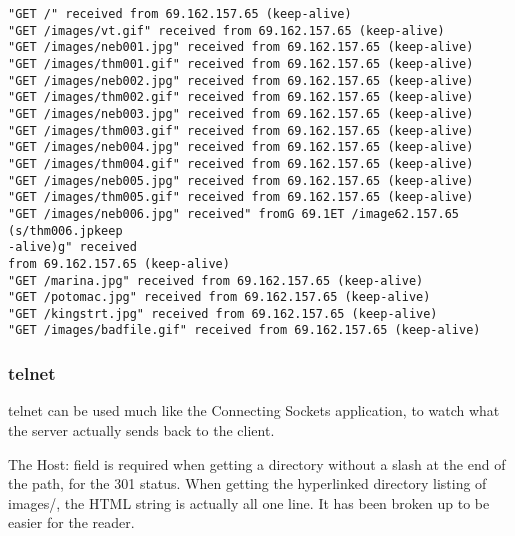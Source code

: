\documentclass[11pt]{report}
\begin{document}
\begin{verbatim}
"GET /" received from 69.162.157.65 (keep-alive)
"GET /images/vt.gif" received from 69.162.157.65 (keep-alive)
"GET /images/neb001.jpg" received from 69.162.157.65 (keep-alive)
"GET /images/thm001.gif" received from 69.162.157.65 (keep-alive)
"GET /images/neb002.jpg" received from 69.162.157.65 (keep-alive)
"GET /images/thm002.gif" received from 69.162.157.65 (keep-alive)
"GET /images/neb003.jpg" received from 69.162.157.65 (keep-alive)
"GET /images/thm003.gif" received from 69.162.157.65 (keep-alive)
"GET /images/neb004.jpg" received from 69.162.157.65 (keep-alive)
"GET /images/thm004.gif" received from 69.162.157.65 (keep-alive)
"GET /images/neb005.jpg" received from 69.162.157.65 (keep-alive)
"GET /images/thm005.gif" received from 69.162.157.65 (keep-alive)
"GET /images/neb006.jpg" received" fromG 69.1ET /image62.157.65 (s/thm006.jpkeep
-alive)g" received
from 69.162.157.65 (keep-alive)
"GET /marina.jpg" received from 69.162.157.65 (keep-alive)
"GET /potomac.jpg" received from 69.162.157.65 (keep-alive)
"GET /kingstrt.jpg" received from 69.162.157.65 (keep-alive)
"GET /images/badfile.gif" received from 69.162.157.65 (keep-alive)
\end{verbatim}

\subsubsection{telnet}

telnet can be used much like the Connecting Sockets application, to watch what the server actually sends back to the client.

The Host: field is required when getting a directory without a slash at the end of the path, for the 301 status. When getting the hyperlinked directory listing of images/, the HTML string is actually all one line. It has been broken up to be easier for the reader.
\end{document}
